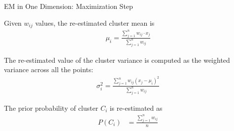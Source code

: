 \begin{frame}{EM in One Dimension: Maximization Step}

Given $w_{ij}$ values, the re-estimated cluster mean is
\begin{align*}
    \mu_{i} = \frac{\sum_{j=1}^n w_{ij} \cdot x_{j}}
    {\sum_{j=1}^n w_{ij}}
\end{align*}

\smallskip
The re-estimated value of the cluster variance is computed as the
weighted variance across all the points:
\begin{align*}
\sigma_{i}^{2} =
    \frac{\sum_{j=1}^n w_{ij}(x_{j}-\mu_{i})^2}
        {\sum_{j=1}^n w_{ij}}
\end{align*}

\smallskip
The prior probability of cluster $C_i$ is re-estimated as
\begin{align*}
P(C_{i}) & =
    \frac{\sum_{j=1}^n w_{ij}}{n}
\end{align*}
\end{frame}


